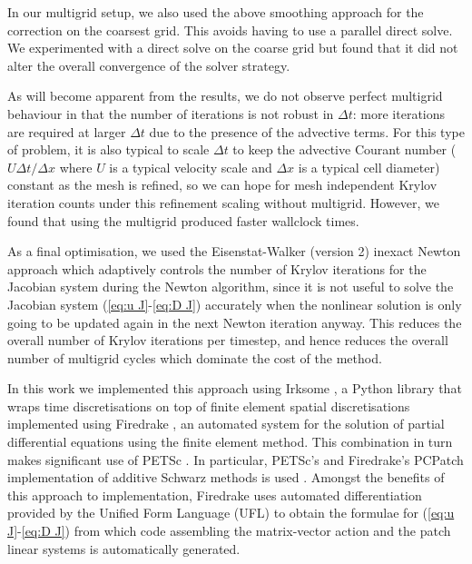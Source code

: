 \documentclass[a4paper, 12pt]{article}
\begin{document}
In our multigrid setup, we also used the above smoothing approach for
the correction on the coarsest grid. This avoids having to use a
parallel direct solve. We experimented with a direct solve on the coarse
grid but found that it did not alter the overall convergence of the
solver strategy.

As will become apparent from the results, we do not observe perfect
multigrid behaviour in that the number of iterations is not robust in
$\Delta t$: more iterations are required at larger $\Delta t$ due to
the presence of the advective terms.  For this type of problem, it is
also typical to scale $\Delta t$ to keep the advective Courant number
($U\Delta t/\Delta x$ where $U$ is a typical velocity scale and
$\Delta x$ is a typical cell diameter) constant as the mesh is
refined, so we can hope for mesh independent Krylov iteration counts
under this refinement scaling without multigrid. However, we found
that using the multigrid produced faster wallclock times.

As a final optimisation, we used the Eisenstat-Walker (version 2)
inexact Newton approach \citep{eisenstat1996choosing} which adaptively
controls the number of Krylov iterations for the Jacobian system
during the Newton algorithm, since it is not useful to solve the
Jacobian system (\ref{eq:u J}-\ref{eq:D J}) accurately when the nonlinear solution is only going
to be updated again in the next Newton iteration anyway. This reduces the overall
number of Krylov iterations per timestep, and hence reduces the overall
number of multigrid cycles which dominate the cost of the method.

In this work we implemented this approach using Irksome
\citep{farrell2021irksome,kirby2024extending}, a Python library that
wraps time discretisations on top of finite element spatial
discretisations implemented using Firedrake
\citep{FiredrakeUserManual}, an automated system for the solution of
partial differential equations using the finite element method.  This
combination in turn makes significant use of PETSc
\citep{dalcin2011parallel,balay2019petsc}. In particular, PETSc's and
Firedrake's PCPatch implementation of additive Schwarz methods is used
\citep{farrell2021pcpatch}.  Amongst the benefits of this approach to
implementation, Firedrake uses automated differentiation provided by
the Unified Form Language (UFL) \citep{alnaes2012ufl} to obtain the
formulae for (\ref{eq:u J}-\ref{eq:D J}) from which code assembling
the matrix-vector action and the patch linear systems is automatically
generated.
\end{document}
